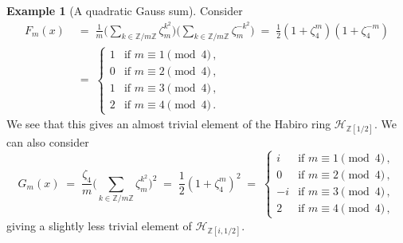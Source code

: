 \documentclass[12pt,reqno]{amsart}
\theoremstyle{definition}
\newtheorem{example}[proposition]{Example}
\def\BZ{\mathbb Z}
\def\calH{\mathcal H}
\def\be{\begin{equation}}
\def\ee{\end{equation}}
\def\z{\zeta}
\def\={\;=\;}
\begin{document}
\begin{example}[A quadratic Gauss sum]
Consider
\be
\begin{aligned}
F_{m}(x)&\=\frac{1}{m}\bigg(\sum_{k\in\BZ/m\BZ}\z_m^{k^2}\bigg)
\bigg(\sum_{k\in\BZ/m\BZ}\z_m^{-k^2}\bigg)
\= \frac{1}{2}(1+\z_4^{m})(1+\z_4^{-m})\\
&\=
\left\{
\begin{array}{cl}
1 & \text{if }m\equiv 1\pmod{4}\,,\\
0 & \text{if }m\equiv 2\pmod{4}\,,\\
1 & \text{if }m\equiv 3\pmod{4}\,,\\
2 & \text{if }m\equiv 4\pmod{4}\,.
\end{array}
\right.
\end{aligned}
\ee
We see that this gives an almost trivial element of the Habiro ring
$\calH_{\BZ[1/2]}$. We can also consider
\be
G_{m}(x)\=\frac{\z_4}{m}\bigg(\sum_{k\in\BZ/m\BZ}\z_m^{k^2}\bigg)^2
\= \frac{1}{2}(1+\z_4^{m})^2
\=
\left\{
\begin{array}{cl}
i & \text{if }m\equiv 1\pmod{4}\,,\\
0 & \text{if }m\equiv 2\pmod{4}\,,\\
-i & \text{if }m\equiv 3\pmod{4}\,,\\
2 & \text{if }m\equiv 4\pmod{4}\,,
\end{array}
\right.
\ee
giving a slightly less trivial element of $\calH_{\BZ[i,1/2]}$.
\end{example}
\end{document}
